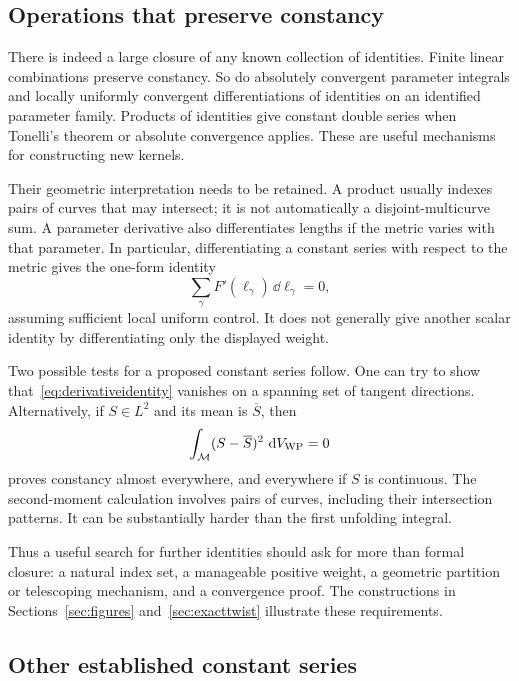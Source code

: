 \subsection{Operations that preserve constancy}

There is indeed a large closure of any known collection of identities.
Finite linear combinations preserve constancy. So do absolutely convergent
parameter integrals and locally uniformly convergent differentiations of
identities on an identified parameter family. Products of identities give
constant double series when Tonelli's theorem or absolute convergence
applies. These are useful mechanisms for constructing new kernels.

Their geometric interpretation needs to be retained. A product usually
indexes pairs of curves that may intersect; it is not automatically a
disjoint-multicurve sum. A parameter derivative also differentiates lengths
if the metric varies with that parameter. In particular, differentiating
a constant series with respect to the metric gives the one-form identity
\begin{equation}
 \sum_\gamma F'(\ell_\gamma)\,\dd\ell_\gamma=0,
 \label{eq:derivativeidentity}
\end{equation}
assuming sufficient local uniform control. It does not generally give
another scalar identity by differentiating only the displayed weight.

Two possible tests for a proposed constant series follow. One can try to
show that~\eqref{eq:derivativeidentity} vanishes on a spanning set of tangent
directions. Alternatively, if $S\in L^2$ and its mean is $\overline S$, then
\begin{equation}
 \int_{\mathcal M}(S-\overline S)^2\,\mathop{}\!\mathrm d V_{\mathrm{WP}}=0
 \label{eq:variance}
\end{equation}
proves constancy almost everywhere, and everywhere if $S$ is continuous.
The second-moment calculation involves pairs of curves, including their
intersection patterns. It can be substantially harder than the first
unfolding integral.

Thus a useful search for further identities should ask for more than
formal closure: a natural index set, a manageable positive weight, a
geometric partition or telescoping mechanism, and a convergence proof.
The constructions in Sections~\ref{sec:figures} and~\ref{sec:exacttwist}
illustrate these requirements.

\subsection{Other established constant series}

